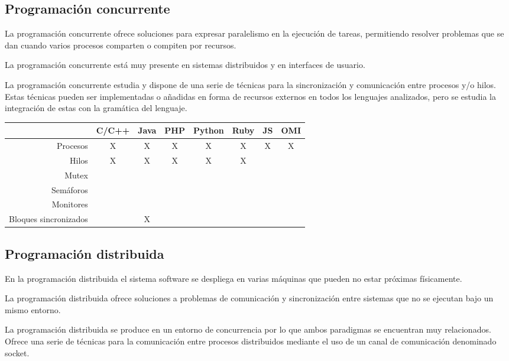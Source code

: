 \subsection{Programación concurrente}
La programación concurrente ofrece soluciones para expresar paralelismo en la ejecución de 
tareas, permitiendo resolver problemas que se dan cuando varios procesos comparten o compiten
por recursos.

La programación concurrente está muy presente en sistemas distribuidos y en interfaces de
usuario.

La programación concurrente estudia y dispone de una serie de técnicas para la sincronización 
y comunicación entre procesos y/o hilos. Estas técnicas pueden ser implementadas o añadidas en forma de recursos externos en todos los lenguajes analizados, pero se estudia la integración de estas con la gramática del lenguaje.

\FloatBarrier
\begin{table}[h]
\begin{center}
 
\begin{tabular}{|r|c|c|c|c|c|c|c|} \hline
 & C/C++ & Java & PHP  & Python & Ruby & JS & OMI\\ \hline
Procesos & X & X & X & X & X  & X & X \\ \hline
Hilos & X & X & X & X & X &  &  \\ \hline
Mutex &  & &  &  & &  &  \\ \hline
Semáforos &  & &  &  & &  &  \\ \hline
Monitores & & & & & &  &  \\ \hline
Bloques sincronizados & & X  & & & &  &  \\ \hline
\end{tabular}
\end{center}
\end{table}
\FloatBarrier



\subsection{Programación distribuida}
En la programación distribuida el sistema software se despliega 
en varias máquinas que pueden no estar próximas físicamente.  

La programación distribuida ofrece soluciones a problemas de 
comunicación y sincronización entre sistemas que no se
ejecutan bajo un mismo entorno. 

La programación distribuida se produce en un entorno de concurrencia por lo
que ambos paradigmas se encuentran muy relacionados. Ofrece una serie de técnicas para la comunicación entre procesos distribuidos mediante el uso de un canal de comunicación 
denominado socket. 

